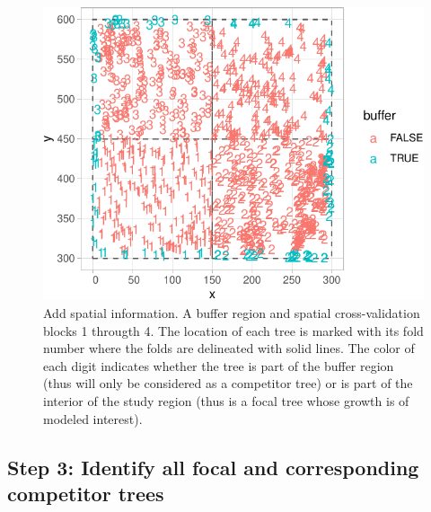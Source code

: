 \documentclass[12pt]{article}
\newenvironment{Shaded}{\begin{snugshade}}{\end{snugshade}}
\newcommand{\DataTypeTok}[1]{\textcolor[rgb]{0.13,0.29,0.53}{#1}}
\newcommand{\DecValTok}[1]{\textcolor[rgb]{0.00,0.00,0.81}{#1}}
\newcommand{\KeywordTok}[1]{\textcolor[rgb]{0.13,0.29,0.53}{\textbf{#1}}}
\newcommand{\NormalTok}[1]{#1}
\newcommand{\OperatorTok}[1]{\textcolor[rgb]{0.81,0.36,0.00}{\textbf{#1}}}
\newcommand{\StringTok}[1]{\textcolor[rgb]{0.31,0.60,0.02}{#1}}
\begin{document}
\begin{Shaded}
\end{Shaded}

\begin{figure}

{\centering \includegraphics[width=0.66\linewidth]{Figures/scbi-spatial-information-1} 

}

\caption{Add spatial information. A buffer region and spatial cross-validation blocks 1 througth 4. The location of each tree is marked with its fold number where the folds are delineated with solid lines. The color of each digit indicates whether the tree is part of the buffer region (thus will only be considered as a competitor tree) or is part of the interior of the study region (thus is a focal tree whose growth is of modeled interest).}\label{fig:scbi-spatial-information}
\end{figure}

\hypertarget{focal-vs-comp}{%
\subsection{Step 3: Identify all focal and corresponding competitor
trees}\label{focal-vs-comp}}
\end{document}
